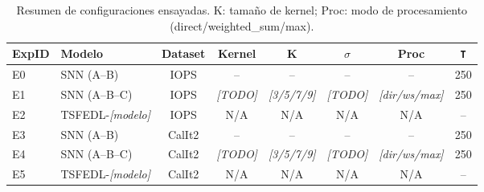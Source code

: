 \begin{table}[htbp]
\centering
\small
\begin{tabular}{llcccccc}
\hline\hline
\textbf{ExpID} & \textbf{Modelo} & \textbf{Dataset} & \textbf{Kernel} & \textbf{K} & \(\sigma\) & \textbf{Proc} & \texttt{T} \\
\hline
E0 & SNN (A--B) & IOPS & -- & -- & -- & -- & 250 \\
E1 & SNN (A--B--C) & IOPS & \textit{[TODO]} & \textit{[3/5/7/9]} & \textit{[TODO]} & \textit{[dir/ws/max]} & 250 \\
E2 & TSFEDL-\textit{[modelo]} & IOPS & N/A & N/A & N/A & N/A & -- \\
E3 & SNN (A--B) & CalIt2 & -- & -- & -- & -- & 250 \\
E4 & SNN (A--B--C) & CalIt2 & \textit{[TODO]} & \textit{[3/5/7/9]} & \textit{[TODO]} & \textit{[dir/ws/max]} & 250 \\
E5 & TSFEDL-\textit{[modelo]} & CalIt2 & N/A & N/A & N/A & N/A & -- \\
\hline\hline
\end{tabular}
\caption{Resumen de configuraciones ensayadas. K: tamaño de kernel; Proc: modo de procesamiento (direct/weighted\_sum/max).}
\label{tab:resumen-configuraciones}
\end{table}